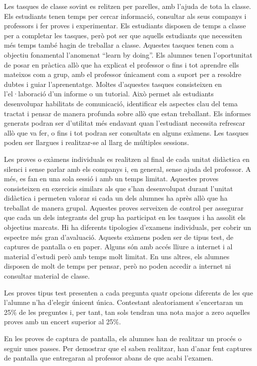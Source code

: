 \documentclass[catalan, a4paper, 12pt, titlepage]{article}
\begin{document}
Les tasques de classe sovint es relitzen per parelles, amb l'ajuda de tota la classe.
Els estudiants tenen temps per cercar informació, consultar als seus companys i professors i fer proves i experimentar. 
Els estudiants disposen de temps a classe per a completar les tasques, però pot ser que aquells estudiants que necessiten més temps també hagin de treballar a classe.
Aquestes tasques tenen com a objectiu fonamental l'anomenat ``learn by doing''.
Els alumnes tenen l'oportunitat de posar en pràctica allò que ha explicat el professor o fins i tot aprendre ells mateixos com a grup, amb el professor únicament com a suport per a resoldre dubtes i guiar l'aprenentatge.
Moltes d'aquestes tasques consisteixen en l'el·laboració d'un informe o un tutorial.
Això permet als estudiants desenvolupar habilitats de comunicació, identificar els aspectes clau del tema tractat i pensar de manera profunda sobre allò que estan treballant. Els informes generats podran ser d'utilitat més endavant quan l'estudiant necessita refrescar allò que va fer, o fins i tot podran ser consultats en alguns exàmens.
Les tasques poden ser llargues i realitzar-se al llarg de múltiples sessions.

Les proves o exàmens individuals es realitzen al final de cada unitat didàctica en silenci i sense parlar amb els companys i, en general, sense ajuda del professor.
A més, es fan en una sola sessió i amb un temps limitat.
Aquestes proves consisteixen en exercicis similars als que s'han desenvolupat durant l'unitat didàctica i permeten valorar si cada un dels alumnes ha après allò que ha treballat de manera grupal.
Aquestes proves serveixen de control per assegurar que cada un dels integrants del grup ha participat en les tasques i ha assolit els objectius marcats.
Hi ha diferents tipologies d'examens individuals, per cobrir un espectre més gran d'avaluació. Aquests exàmens poden ser de tipus test, de captures de pantalla o en paper. 
Alguns són amb accés lliure a internet i al material d'estudi però amb temps molt limitat.
En uns altres, els alumnes disposen de molt de temps per pensar, però no poden accedir a internet ni consultar material de classe.

Les proves tipus test presenten a cada pregunta quatr opcions diferents de les que l'alumne n'ha d'elegir únicent única.
Contestant aleatoriament s'encertaran un 25\% de les preguntes i, per tant, tan sols tendran una nota major a zero aquelles proves amb un encert superior al 25\%.

En les proves de captura de pantalla, els alumnes han de realitzar un procés o seguir unes passes.
Per demostrar que el saben realitzar, han d'anar fent captures de pantalla que entregaran al professor abans de que acabi l'examen.
\end{document}
